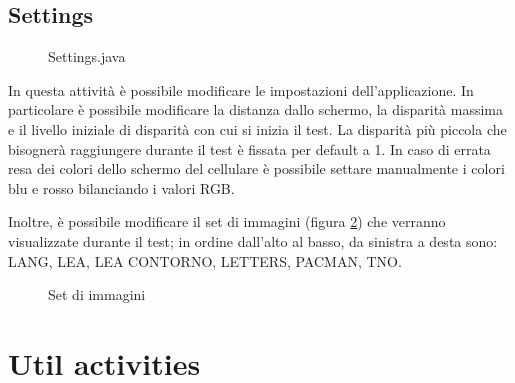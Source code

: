 \documentclass[
	corpo=12pt,
	twoside,
 	evenboxes,
	tipotesi=triennale,
    	stile=classica,
   	 greek,
]{toptesi}
\begin{document}
\subsection{Settings}
\label{subsec:settings}
\begin{figure}[H]
\centering
{}
\caption{Settings.java}
\label{fig:app_settings}
\end{figure}
In questa attività è possibile modificare le impostazioni dell'applicazione. In particolare è possibile modificare la distanza dallo schermo, la disparità massima e il livello iniziale di disparità con cui si inizia il test. La disparità più piccola che bisognerà raggiungere durante il test è fissata per default a 1. In caso di errata resa dei colori dello schermo del cellulare è possibile settare manualmente i colori blu e rosso bilanciando i valori RGB.

Inoltre, è possibile modificare il set di immagini (figura \ref{fig:app_set_images}) che verranno visualizzate durante il test; in ordine dall'alto al basso, da sinistra a desta sono: LANG, LEA, LEA CONTORNO, LETTERS, PACMAN, TNO.

\begin{figure}[H]
\centering
{}
\caption{Set di immagini}
\label{fig:app_set_images}
\end{figure}

\vfill

\section{Util activities}
\label{sec:utilactivities}
\end{document}

